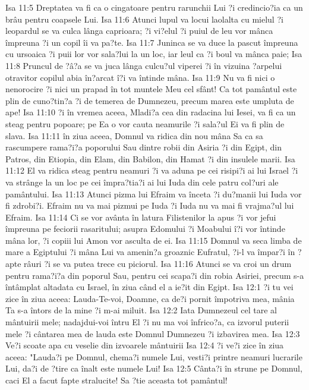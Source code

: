 Isa 11:5  Dreptatea va fi ca o cingatoare pentru rarunchii Lui ?i credincio?ia ca un brâu pentru coapsele Lui.
Isa 11:6  Atunci lupul va locui laolalta cu mielul ?i leopardul se va culca lânga caprioara; ?i vi?elul ?i puiul de leu vor mânca împreuna ?i un copil îi va pa?te.
Isa 11:7  Juninca se va duce la pascut împreuna cu ursoaica ?i puii lor vor sala?lui la un loc, iar leul ca ?i boul va mânca paie;
Isa 11:8  Pruncul de ?â?a se va juca lânga culcu?ul viperei ?i în vizuina ?arpelui otravitor copilul abia în?arcat î?i va întinde mâna.
Isa 11:9  Nu va fi nici o nenorocire ?i nici un prapad în tot muntele Meu cel sfânt! Ca tot pamântul este plin de cuno?tin?a ?i de temerea de Dumnezeu, precum marea este umpluta de ape!
Isa 11:10  ?i în vremea aceea, Mladi?a cea din radacina lui Iesei, va fi ca un steag pentru popoare; pe Ea o vor cauta neamurile ?i sala?ul Ei va fi plin de slava.
Isa 11:11  în ziua aceea, Domnul va ridica din nou mâna Sa ca sa rascumpere rama?i?a poporului Sau dintre robii din Asiria ?i din Egipt, din Patros, din Etiopia, din Elam, din Babilon, din Hamat ?i din insulele marii.
Isa 11:12  El va ridica steag pentru neamuri ?i va aduna pe cei risipi?i ai lui Israel ?i va strânge la un loc pe cei împra?tia?i ai lui Iuda din cele patru col?uri ale pamântului.
Isa 11:13  Atunci pizma lui Efraim va înceta ?i du?manii lui Iuda vor fi zdrobi?i. Efraim nu va mai pizmui pe Iuda ?i Iuda nu va mai fi vrajma?ul lui Efraim.
Isa 11:14  Ci se vor avânta în latura Filistenilor la apus ?i vor jefui împreuna pe feciorii rasaritului; asupra Edomului ?i Moabului î?i vor întinde mâna lor, ?i copiii lui Amon vor asculta de ei.
Isa 11:15  Domnul va seca limba de mare a Egiptului ?i mâna Lui va amenin?a groaznic Eufratul, ?i-l va împar?i în ?apte râuri ?i se va putea trece cu piciorul.
Isa 11:16  Atunci se va croi un drum pentru rama?i?a din poporul Sau, pentru cei scapa?i din robia Asiriei, precum s-a întâmplat altadata cu Israel, în ziua când el a ie?it din Egipt.
Isa 12:1  ?i tu vei zice în ziua aceea: Lauda-Te-voi, Doamne, ca de?i pornit împotriva mea, mânia Ta s-a întors de la mine ?i m-ai miluit.
Isa 12:2  Iata Dumnezeul cel tare al mântuirii mele; nadajdui-voi întru El ?i nu ma voi înfrico?a, ca izvorul puterii mele ?i cântarea mea de lauda este Domnul Dumnezeu ?i izbavirea mea.
Isa 12:3  Ve?i scoate apa cu veselie din izvoarele mântuirii
Isa 12:4  ?i ve?i zice în ziua aceea: "Lauda?i pe Domnul, chema?i numele Lui, vesti?i printre neamuri lucrarile Lui, da?i de ?tire ca înalt este numele Lui!
Isa 12:5  Cânta?i în strune pe Domnul, caci El a facut fapte stralucite! Sa ?tie aceasta tot pamântul!
